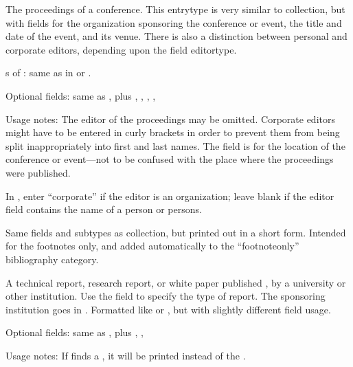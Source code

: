 \documentclass{ltxdockit}[2010/02/12]
\begin{document}
\begin{typelist}

The proceedings of a conference. This entrytype is very similar to collection, but with fields for the organization sponsoring the conference or event, the title and date of the event, and its venue. There is also a distinction between personal and corporate editors, depending upon the field editortype.

s of : same as in  or .
\item Optional fields: same as , plus , , , , 

Usage notes: The editor of the proceedings may be omitted. Corporate editors might have to be entered in curly brackets in order to prevent them from being split inappropriately into first and last names. The  field is for the location of the conference or event---not to be confused with the place where the proceedings were published. 

In , enter ``corporate'' if the editor is an organization; leave blank if the editor field contains the name of a person or persons. 


Same fields and subtypes as collection, but printed out in a short form. Intended for the footnotes only, and added automatically to the ``footnoteonly'' bibliography category.



A technical report, research report, or white paper published \eg, by a university or other institution. Use the  field to specify the type of report. The sponsoring institution goes in . Formatted like  or , but with slightly different field usage.

\item Optional fields: same as , plus , , 

Usage notes: If  finds a , it will be printed instead of the .




\end{typelist}
\end{document}
